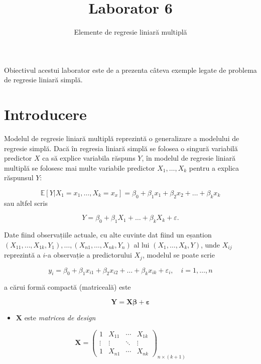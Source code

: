 \documentclass[]{article}
\title{Laborator 6}
\subtitle{Elemente de regresie liniară multiplă}
\author{}
\date{}
\providecommand{\tightlist}{%
  \setlength{\itemsep}{0pt}\setlength{\parskip}{0pt}}
\begin{document}
\maketitle

\thispagestyle{fancy}

Obiectivul acestui laborator este de a prezenta câteva exemple legate de
problema de regresie liniară simplă.

\section{Introducere}\label{introducere}

Modelul de regresie liniară multiplă reprezintă o generalizare a
modelului de regresie simplă. Dacă în regresia liniară simplă se folosea
o singură variabilă predictor \(X\) ca să explice variabila răspuns
\(Y\), în modelul de regresie liniară multiplă se folosesc mai multe
variabile predictor \(X_1,\ldots,X_k\) pentru a explica răspunsul \(Y\):

\[
\mathbb{E}[Y|X_1 = x_1, \ldots, X_k=x_x]=\beta_0+\beta_1x_1+\beta_2x_2+\ldots+\beta_kx_k
\] sau altfel scris

\[
Y = \beta_0 + \beta_1 X_1 + \ldots + \beta_k X_k + \varepsilon.
\]

Date fiind observațiile actuale, cu alte cuvinte dat fiind un eșantion
\((X_{11},\ldots,X_{1k},Y_1),\ldots,(X_{n1},\ldots,X_{nk},Y_n)\) al lui
\((X_1,\ldots,X_k,Y)\), unde \(X_{ij}\) reprezintă a \(i\)-a observație
a predictorului \(X_j\), modelul se poate scrie

\[
y_i = \beta_0+\beta_1x_{i1}+\beta_2x_{i2}+\ldots+\beta_kx_{ik}+\varepsilon_i, \quad i = 1,\ldots,n
\]

a cărui formă compactă (matriceală) este

\[
\mathbf{Y}=\mathbf{X}\boldsymbol\beta+\boldsymbol\varepsilon
\]

\begin{itemize}
\tightlist
\item
  \(\mathbf{X}\) este \emph{matricea de design}
\end{itemize}

\[
\mathbf{X}=\begin{pmatrix}
1 & X_{11} & \cdots & X_{1k}\\
\vdots & \vdots & \ddots & \vdots\\
1 & X_{n1} & \cdots & X_{nk}
\end{pmatrix}_{n\times(k+1)}
\]
\end{document}
